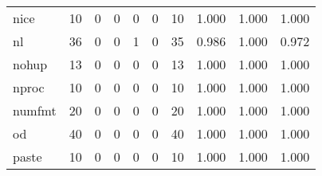 \begin{longtable}{lp{1.3cm}p{1.3cm}p{1.3cm}p{1.3cm}p{1.3cm}p{1.3cm}p{1.3cm}p{1.3cm}p{1.3cm}}
nice      &                     10 &                                             0 &                                            0 &                                           0 &                                            0 &                                         10 &                                1.000 &                                  1.000 &                                1.000 \\
nl        &                     36 &                                             0 &                                            0 &                                           1 &                                            0 &                                         35 &                                0.986 &                                  1.000 &                                0.972 \\
nohup     &                     13 &                                             0 &                                            0 &                                           0 &                                            0 &                                         13 &                                1.000 &                                  1.000 &                                1.000 \\
nproc     &                     10 &                                             0 &                                            0 &                                           0 &                                            0 &                                         10 &                                1.000 &                                  1.000 &                                1.000 \\
numfmt    &                     20 &                                             0 &                                            0 &                                           0 &                                            0 &                                         20 &                                1.000 &                                  1.000 &                                1.000 \\
od        &                     40 &                                             0 &                                            0 &                                           0 &                                            0 &                                         40 &                                1.000 &                                  1.000 &                                1.000 \\
paste     &                     10 &                                             0 &                                            0 &                                           0 &                                            0 &                                         10 &                                1.000 &                                  1.000 &                                1.000 \\

\end{longtable}
